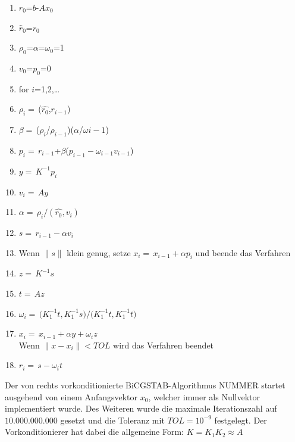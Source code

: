 \begin{enumerate}
	\setlength{\itemsep}{0cm}
	\setlength{\parsep}{0cm}
	
	
	\item $r_0$=$b$-$A$$x_0$\\
	\item $\hat{r}_0$=$r_0$\\
	\item $\rho_0$=$\alpha$=$\omega_0$=1\\
	\item $v_0$=$p_0$=0\\
	\item for $i$=1,2,\dots
	\par
	\begingroup
	\leftskip=1cm 
	\noindent 
	\item$\rho_i=$\,($\hat{r_0}$,$r_{i-1}$)\\
	\item$\beta=$\,($\rho_i$/$\rho_{i-1}$)($\alpha$/$\omega{i-1}$)\\
	\item$p_i=$\,$r_{i-1}$+$\beta$($p_{i-1}-\omega_{i-1}v_{i-1}$)	\\
	\item$y=$\,$K^{-1}p_i$\\
	\item$v_i=$\,$Ay$\\
	\item$\alpha=$\,$\rho_i/(\hat{r_0},v_i)$\\
	\item$s=$\,$r_{i-1}-\alpha$$v_i$\\
	\item Wenn $\parallel s \parallel$ klein genug, setze $x_i=$\,$x_{i-1}+\alpha$$p_i$ und beende das Verfahren \\
	\item$z=$\,$K^{-1}s$\\
	\item$t=$\,$Az$\\
	\item$\omega_i=$\,$(K^{-1}_1$$t,K^{-1}_1$$s)/(K^{-1}_1$$t,K^{-1}_1$$t)$ \\
	\item$x_i=$\,$x_{i-1}+\alpha$$y+\omega_i$$z$\\
	Wenn $\parallel x-x_i \parallel < TOL $ wird das Verfahren beendet \\
	\item$r_i=$\,$s-\omega_i$$t$\\
	
	
	\par
	\endgroup 
\end{enumerate}
Der von rechts vorkonditionierte BiCGSTAB-Algorithmus NUMMER startet ausgehend von einem Anfangsvektor $x_0$, welcher immer als Nullvektor implementiert wurde. Des Weiteren wurde die maximale Iterationszahl auf $10.000.000.000$ gesetzt und die Toleranz mit $TOL= 10^{-9}$ festgelegt. Der Vorkonditionierer hat dabei die allgemeine Form: 
$K = K_1 K_2 \approx A $


